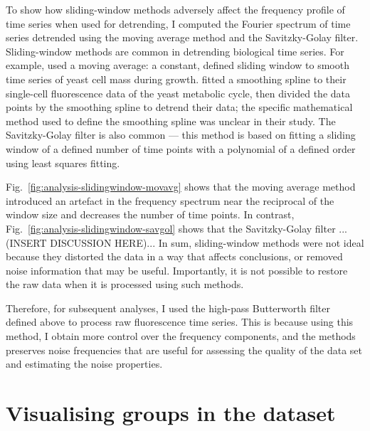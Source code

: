 To show how sliding-window methods adversely affect the frequency profile of time series when used for detrending, I computed the Fourier spectrum of time series detrended using the moving average method and the Savitzky-Golay filter.
Sliding-window methods are common in detrending biological time series.
For example, \textcite{cunyHighresolutionMassMeasurements2022} used a moving average: a constant, defined sliding window to smooth time series of yeast cell mass during growth.
\textcite{papagiannakisAutonomousMetabolicOscillations2017} fitted a smoothing spline to their single-cell fluorescence data of the yeast metabolic cycle, then divided the data points by the smoothing spline to detrend their data; the specific mathematical method used to define the smoothing spline was unclear in their study.
The Savitzky-Golay filter is also common --- this method is based on fitting a sliding window of a defined number of time points with a polynomial of a defined order using least squares fitting.

Fig.\ \ref{fig:analysis-slidingwindow-movavg} shows that the moving average method introduced an artefact in the frequency spectrum near the reciprocal of the window size and decreases the number of time points.
In contrast, Fig.\ \ref{fig:analysis-slidingwindow-savgol} shows that the Savitzky-Golay filter ...(INSERT DISCUSSION HERE)...
In sum, sliding-window methods were not ideal because they distorted the data in a way that affects conclusions, or removed noise information that may be useful.
Importantly, it is not possible to restore the raw data when it is processed using such methods.

Therefore, for subsequent analyses, I used the high-pass Butterworth filter defined above to process raw fluorescence time series.
This is because using this method, I obtain more control over the frequency components, and the methods preserves noise frequencies that are useful for assessing the quality of the data set and estimating the noise properties.


\section{Visualising groups in the dataset}
\label{sec:analysis-clustering}

